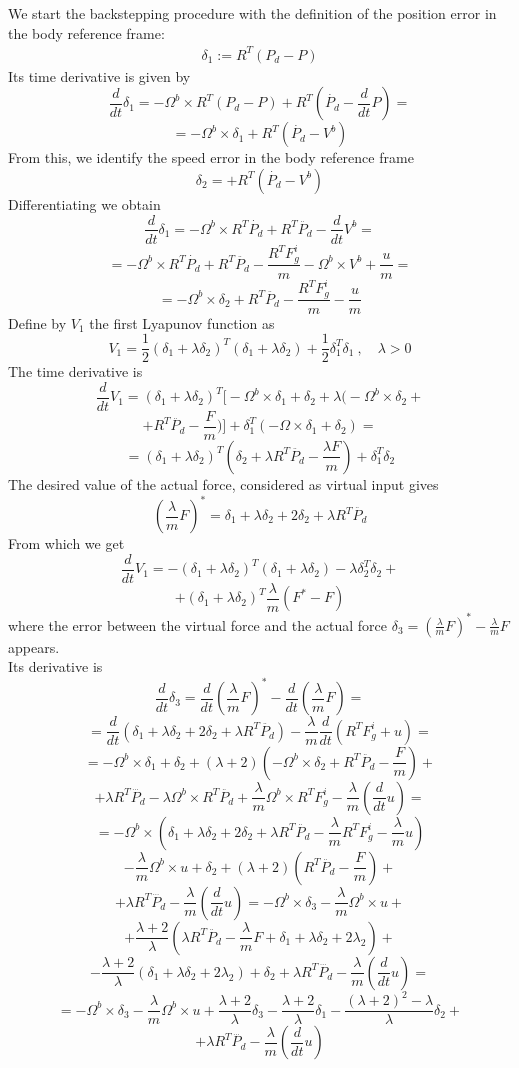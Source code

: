 
We start the backstepping procedure with the definition of the position error in the body reference frame:
\begin{align*}
    \delta_1 := R^T(P_d-P)
\end{align*}
Its time derivative is given by
\[\frac{d}{dt}\delta_1=-\Omega^b \times R^T(P_d-P)+ R^T(\dot{P_d}-\frac{d}{dt}P)= \]\[=-\Omega^b \times \delta_1+R^T(\dot{P_d}-V^b)\]
From this, we identify the speed error in the body reference frame
\[\delta_2=+R^T(\dot{P_d}-V^b)\]
Differentiating we obtain
\[\frac{d}{dt}\delta_1=-\Omega^b \times R^T\dot{P_d}+R^T\ddot{P_d}-\frac{d}{dt}V^b=\]\[=-\Omega^b \times R^T\dot{P_d}+R^T\ddot{P_d}-\frac{R^TF_g^i}{m}-\Omega^b \times V^b+\frac{u}{m}=\]\[=-\Omega^b \times\delta_2+R^T\ddot{P_d}-\frac{R^TF_g^i}{m}-\frac{u}{m}\]
Define by $V_1$ the first Lyapunov function as
\[V_1=\frac{1}{2}(\delta_1+\lambda \delta_2)^T(\delta_1+\lambda \delta_2)+\frac{1}{2}\delta_1^T\delta_1 \:, \quad \lambda>0\]
The time derivative is 
\[
\frac{d}{dt}V_1=(\delta_1+\lambda \delta_2)^T 
\Bigg[-\Omega^b \times\delta_1+\delta_2+ \lambda\Bigg(-\Omega^b \times\delta_2+\]\[+R^T\ddot{P_d}-\frac{F}{m}\Bigg)\Bigg]+\delta_1^T\left(-\Omega \times \delta_1 +\delta_2\right)=\]\[=(\delta_1+\lambda \delta_2)^T\left(\delta_2+\lambda R^T\ddot{P_d}-\frac{\lambda F}{m}\right)+\delta_1^T\delta_2 \]
The desired value of the actual force, considered as virtual input gives
\[\left(\frac{\lambda}{m}F\right)^*=\delta_1+\lambda \delta_2+2\delta_2+\lambda R^T\ddot{P_d}\]
From which we get 
\[\frac{d}{dt}V_1=-(\delta_1+\lambda \delta_2)^T(\delta_1+\lambda \delta_2)-\lambda\delta_2^T\delta_2+\]\[+(\delta_1+\lambda \delta_2)^T\frac{\lambda}{m}(F^*-F)\]
where the error between the virtual force
and the actual force $\delta_3=(\frac{\lambda}{m}F)^*-\frac{\lambda}{m}F $ appears.\\
Its derivative is 
\[\frac{d}{dt}\delta_3=\frac{d}{dt}\left(\frac{\lambda}{m}F\right)^*-\frac{d}{dt}\left(\frac{\lambda}{m}F\right)=\]\[=
\frac{d}{dt}(\delta_1+\lambda \delta_2+2\delta_2+\lambda R^T\ddot{P_d})-\frac{\lambda}{m}\frac{d}{dt}(R^TF_g^i+u)=\]\[=
-\Omega^b \times \delta_1+\delta_2+(\lambda+2)\left(-\Omega^b \times \delta_2+R^T\ddot{P_d}-\frac{F}{m}\right)+\]\[+\lambda R^T\dddot{P_d}-\lambda\Omega^b \times R^T\ddot{P_d}+\frac{\lambda}{m}\Omega^b \times R^TF_g^i-\frac{\lambda}{m}\left(\frac{d}{dt}u\right)=\]\[=
-\Omega^b \times \left(\delta_1+\lambda \delta_2+2\delta_2+\lambda R^T\ddot{P_d}-\frac{\lambda}{m} R^TF_g^i-\frac{\lambda}{m}u\right)\]\[-\frac{\lambda}{m}\Omega^b \times u+\delta_2+(\lambda+2)\left(R^T\ddot{P_d}-\frac{F}{m}\right)+\]\[+\lambda R^T\dddot{P_d}-\frac{\lambda}{m}\left(\frac{d}{dt}u\right)=
-\Omega^b \times \delta_3 -\frac{\lambda}{m}\Omega^b \times u+\]\[+\frac{\lambda+2}{\lambda}\left(\lambda R^T\ddot{P_d}-\frac{\lambda}{m}F+\delta_1+\lambda \delta_2+2\lambda_2\right)+\]\[-\frac{\lambda+2}{\lambda}\left(\delta_1+\lambda \delta_2+2\lambda_2\right)+\delta_2+\lambda R^T\dddot{P_d}-\frac{\lambda}{m}\left(\frac{d}{dt}u\right)=\]\[=
-\Omega^b \times \delta_3 -\frac{\lambda}{m}\Omega^b \times u+\frac{\lambda+2}{\lambda}\delta_3-\frac{\lambda+2}{\lambda}\delta_1-\frac{(\lambda+2)^2-\lambda}{\lambda}\delta_2+\]\[+\lambda R^T\dddot{P_d}-\frac{\lambda}{m}\left(\frac{d}{dt}u\right)
\]
